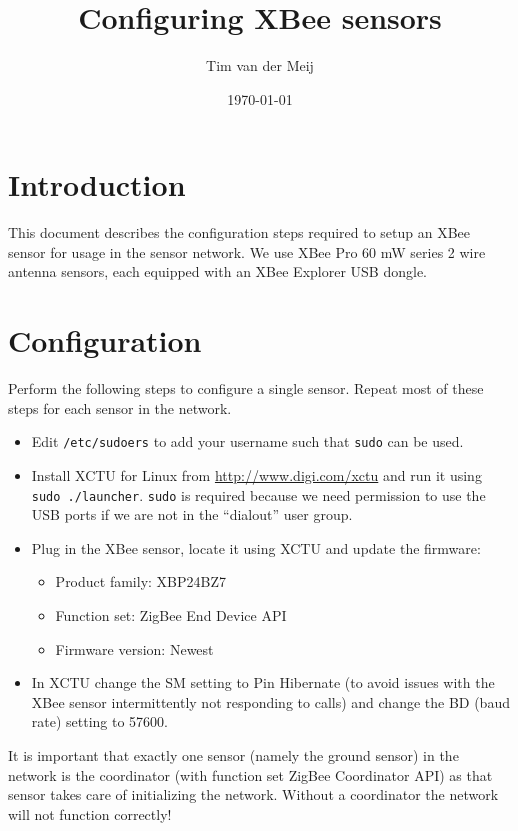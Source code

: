 \documentclass{article}
\begin{document}
\title{Configuring XBee sensors}
\author{Tim van der Meij}
\date{\today}

\maketitle

\section{Introduction}
This document describes the configuration steps required to setup an XBee sensor
for usage in the sensor network. We use XBee Pro 60 mW series 2 wire antenna
sensors, each equipped with an XBee Explorer USB dongle.

\section{Configuration}
Perform the following steps to configure a single sensor. Repeat most of these
steps for each sensor in the network.

\begin{itemize}
    \item Edit {\tt /etc/sudoers} to add your username such that {\tt sudo} can
          be used.
    \item Install XCTU for Linux from \url{http://www.digi.com/xctu} and run it
          using {\tt sudo~./launcher}. {\tt sudo} is required because we need
          permission to use the USB ports if we are not in the ``dialout'' user
          group.
    \item Plug in the XBee sensor, locate it using XCTU and update the firmware:
          \begin{itemize}
              \item Product family: XBP24BZ7
              \item Function set: ZigBee End Device API
              \item Firmware version: Newest
          \end{itemize}
    \item In XCTU change the SM setting to Pin Hibernate (to avoid issues with
          the XBee sensor intermittently not responding to calls) and change the
          BD (baud rate) setting to 57600.
\end{itemize}

It is important that exactly one sensor (namely the ground sensor) in the network
is the coordinator (with function set ZigBee Coordinator API) as that sensor
takes care of initializing the network. Without a coordinator the network will
not function correctly!
\end{document}
